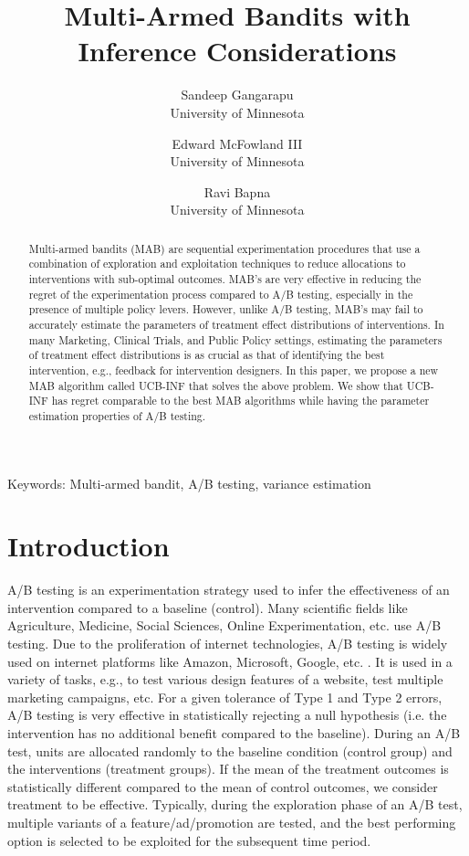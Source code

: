 \documentclass[12pt, letterpaper]{article}
\title{Multi-Armed Bandits with Inference Considerations}
\date{}
\author{Sandeep Gangarapu \\University of Minnesota \and Edward McFowland III \\University of Minnesota \and Ravi Bapna \\University of Minnesota}
\begin{document}
\maketitle

\begin{abstract}
Multi-armed bandits (MAB) are sequential experimentation procedures that use a combination of exploration and exploitation techniques to reduce allocations to interventions with sub-optimal outcomes. MAB's are very effective in reducing the regret of the experimentation process compared to A/B testing, especially in the presence of multiple policy levers. However, unlike A/B testing, MAB's may fail to accurately estimate the parameters of treatment effect distributions of interventions. In many Marketing, Clinical Trials, and Public Policy settings, estimating the parameters of treatment effect distributions is as crucial as that of identifying the best intervention, e.g., feedback for intervention designers. In this paper, we propose a new MAB algorithm called UCB-INF that solves the above problem. We show that UCB-INF has regret comparable to the best MAB algorithms while having the parameter estimation properties of A/B testing. 
\end{abstract}

{Keywords: Multi-armed bandit, A/B testing, variance estimation}

\section*{Introduction}
A/B testing is an experimentation strategy used to infer the effectiveness of an intervention compared to a baseline (control). Many scientific fields like Agriculture, Medicine, Social Sciences, Online Experimentation, etc. use A/B testing. Due to the proliferation of internet technologies, A/B testing is widely used on internet platforms like Amazon, Microsoft, Google, etc. \citep{kohavi2009controlled}. It is used in a variety of tasks, e.g., to test various design features of a website, test multiple marketing campaigns, etc. For a given tolerance of Type 1 and Type 2 errors, A/B testing is very effective in statistically rejecting a null hypothesis (i.e. the intervention has no additional benefit compared to the baseline). During an A/B test, units are allocated randomly to the baseline condition (control group) and the interventions (treatment groups). If the mean of the treatment outcomes is statistically different compared to the mean of control outcomes, we consider treatment to be effective.  Typically, during the exploration phase of an A/B test, multiple variants of a feature/ad/promotion are tested, and the best performing option is selected to be exploited for the subsequent time period.
\end{document}
